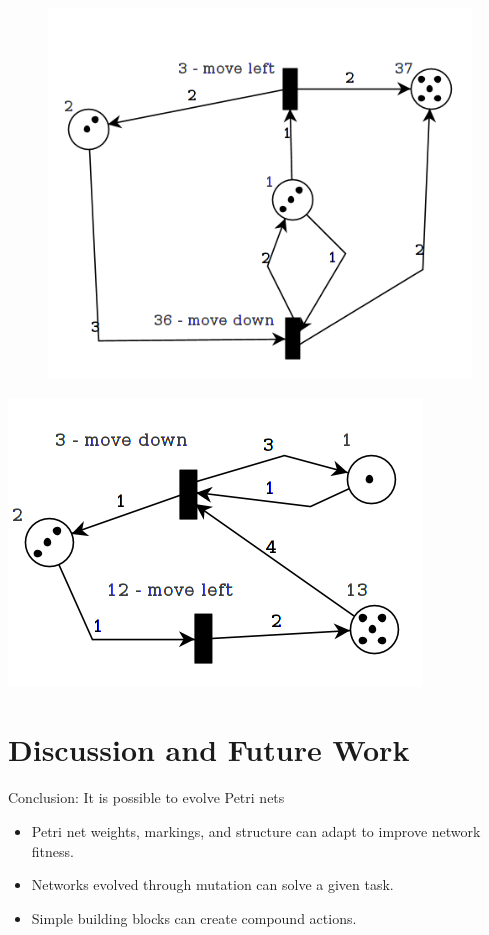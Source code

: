 \documentclass[12pt,a4paper,twocolumn]{article}
\begin{document}
\begin{figure}
\includegraphics[scale=0.3]{PetriNet_2_1}
\end{figure}

\includegraphics[scale=0.3]{PetriNet_2_2}

\section{Discussion and Future Work}

Conclusion: It is possible to evolve Petri nets
\begin{itemize}
\item Petri net weights, markings, and structure can adapt to improve network fitness.
\item Networks evolved through mutation can solve a given task.
\item Simple building blocks can create compound actions.
\end{itemize}
\end{document}
